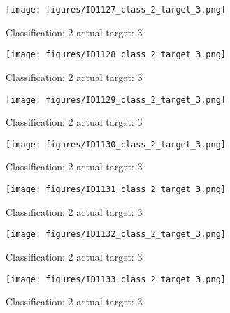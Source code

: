 \begin{figure}[h!]
\begin{center}
\texttt{[image: figures/ID1127\_class\_2\_target\_3.png]}
\end{center}
\caption{ Classification: 2 actual target: 3}
\label{fig:ID1127_class_2_target_3}
\end{figure}
\begin{figure}[h!]
\begin{center}
\texttt{[image: figures/ID1128\_class\_2\_target\_3.png]}
\end{center}
\caption{ Classification: 2 actual target: 3}
\label{fig:ID1128_class_2_target_3}
\end{figure}
\begin{figure}[h!]
\begin{center}
\texttt{[image: figures/ID1129\_class\_2\_target\_3.png]}
\end{center}
\caption{ Classification: 2 actual target: 3}
\label{fig:ID1129_class_2_target_3}
\end{figure}
\begin{figure}[h!]
\begin{center}
\texttt{[image: figures/ID1130\_class\_2\_target\_3.png]}
\end{center}
\caption{ Classification: 2 actual target: 3}
\label{fig:ID1130_class_2_target_3}
\end{figure}
\begin{figure}[h!]
\begin{center}
\texttt{[image: figures/ID1131\_class\_2\_target\_3.png]}
\end{center}
\caption{ Classification: 2 actual target: 3}
\label{fig:ID1131_class_2_target_3}
\end{figure}
\begin{figure}[h!]
\begin{center}
\texttt{[image: figures/ID1132\_class\_2\_target\_3.png]}
\end{center}
\caption{ Classification: 2 actual target: 3}
\label{fig:ID1132_class_2_target_3}
\end{figure}
\begin{figure}[h!]
\begin{center}
\texttt{[image: figures/ID1133\_class\_2\_target\_3.png]}
\end{center}
\caption{ Classification: 2 actual target: 3}
\label{fig:ID1133_class_2_target_3}
\end{figure}
